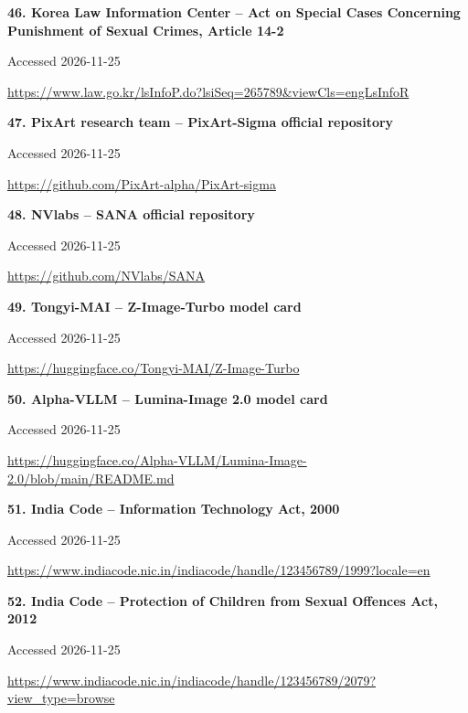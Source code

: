 \documentclass[11pt,a4paper]{article}
\begin{document}
\noindent\begin{minipage}{\linewidth}\textbf{46. Korea Law Information Center -- Act on Special Cases Concerning Punishment of Sexual Crimes, Article 14-2}\par{\small Accessed 2026-11-25\par\url{https://www.law.go.kr/lsInfoP.do?lsiSeq=265789&viewCls=engLsInfoR}}\par
\end{minipage}\par\vspace{2mm}
\noindent\begin{minipage}{\linewidth}\textbf{47. PixArt research team -- PixArt-Sigma official repository}\par{\small Accessed 2026-11-25\par\url{https://github.com/PixArt-alpha/PixArt-sigma}}\par
\end{minipage}\par\vspace{2mm}
\noindent\begin{minipage}{\linewidth}\textbf{48. NVlabs -- SANA official repository}\par{\small Accessed 2026-11-25\par\url{https://github.com/NVlabs/SANA}}\par
\end{minipage}\par\vspace{2mm}
\noindent\begin{minipage}{\linewidth}\textbf{49. Tongyi-MAI -- Z-Image-Turbo model card}\par{\small Accessed 2026-11-25\par\url{https://huggingface.co/Tongyi-MAI/Z-Image-Turbo}}\par
\end{minipage}\par\vspace{2mm}
\noindent\begin{minipage}{\linewidth}\textbf{50. Alpha-VLLM -- Lumina-Image 2.0 model card}\par{\small Accessed 2026-11-25\par\url{https://huggingface.co/Alpha-VLLM/Lumina-Image-2.0/blob/main/README.md}}\par
\end{minipage}\par\vspace{2mm}
\noindent\begin{minipage}{\linewidth}\textbf{51. India Code -- Information Technology Act, 2000}\par{\small Accessed 2026-11-25\par\url{https://www.indiacode.nic.in/indiacode/handle/123456789/1999?locale=en}}\par
\end{minipage}\par\vspace{2mm}
\noindent\begin{minipage}{\linewidth}\textbf{52. India Code -- Protection of Children from Sexual Offences Act, 2012}\par{\small Accessed 2026-11-25\par\url{https://www.indiacode.nic.in/indiacode/handle/123456789/2079?view_type=browse}}\par
\end{minipage}\par\vspace{2mm}
\end{document}
